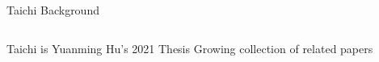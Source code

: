 \placelogofalse
\begin{frame}{Taichi Background}
\begin{columns}
\centering
\begin{outline}
    \1 Taichi is Yuanming Hu's 2021 Thesis
    \1 Growing collection of related papers
\end{outline}

\centering
{}


\end{columns}

\end{frame}
\placelogotrue
